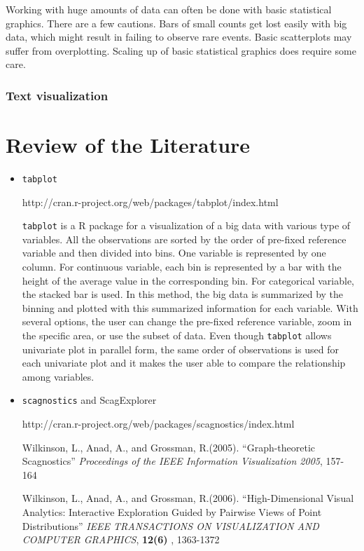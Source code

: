 \documentclass{article}
\begin{document}
Working with huge amounts of data can often be done with basic statistical graphics. There are a few cautions. Bars of small counts get lost easily with big data, which might result in failing to observe rare events. Basic scatterplots may suffer from overplotting.  Scaling up of basic statistical graphics does require some care.

\subsubsection{Text visualization}

\section{Review of the Literature}

\begin{itemize}
\item  {\tt tabplot}

http://cran.r-project.org/web/packages/tabplot/index.html

{\tt tabplot} is a R package for a visualization of a big data with various type of variables.
 All the observations are sorted by the order of pre-fixed reference variable and then divided into bins. One variable is represented by one column. For continuous variable, each bin is represented by a bar with the height of the average value in the corresponding bin. For categorical variable, the stacked bar is used.
 In this method, the big data is summarized by the binning and plotted with this summarized information for each variable. With several options, the user can change the pre-fixed reference variable,
 zoom in the specific area, or use the subset of data. Even though {\tt tabplot} allows univariate plot in parallel form, the same order of observations is used for each univariate plot and it makes the user able to compare the relationship among variables.

\item {\tt scagnostics} and ScagExplorer

http://cran.r-project.org/web/packages/scagnostics/index.html

Wilkinson, L., Anad, A., and Grossman, R.(2005).
``Graph-theoretic Scagnostics''
{\em Proceedings of the IEEE Information Visualization 2005}, 157-164

Wilkinson, L., Anad, A., and Grossman, R.(2006).
``High-Dimensional Visual Analytics: Interactive Exploration Guided by Pairwise Views of Point Distributions''
{\em IEEE TRANSACTIONS ON VISUALIZATION AND COMPUTER GRAPHICS}, {\bf 12(6)} , 1363-1372



\end{itemize}
\end{document}
